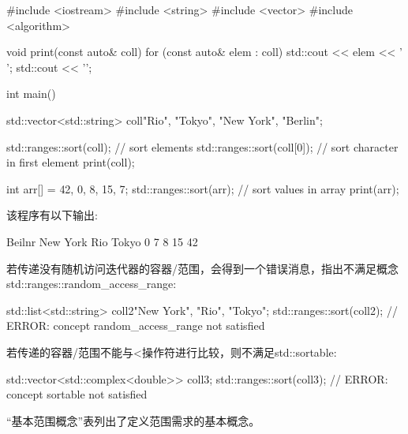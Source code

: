 
\begin{cpp}
#include <iostream>
#include <string>
#include <vector>
#include <algorithm>

void print(const auto& coll) {
	for (const auto& elem : coll) {
		std::cout << elem << ' ';
	}
	std::cout << '\n';
}

int main()
{
	std::vector<std::string> coll{"Rio", "Tokyo", "New York", "Berlin"};
	
	std::ranges::sort(coll); // sort elements
	std::ranges::sort(coll[0]); // sort character in first element
	print(coll);
	
	int arr[] = {42, 0, 8, 15, 7};
	std::ranges::sort(arr); // sort values in array
	print(arr);
}
\end{cpp}

该程序有以下输出:

\begin{shell}
Beilnr New York Rio Tokyo
0 7 8 15 42
\end{shell}

若传递没有随机访问迭代器的容器/范围，会得到一个错误消息，指出不满足概念std::ranges::random\_access\_range:

\begin{cpp}
std::list<std::string> coll2{"New York", "Rio", "Tokyo"};
std::ranges::sort(coll2); // ERROR: concept random_access_range not satisfied
\end{cpp}

若传递的容器/范围不能与<操作符进行比较，则不满足std::sortable:

\begin{cpp}
std::vector<std::complex<double>> coll3;
std::ranges::sort(coll3); // ERROR: concept sortable not satisfied
\end{cpp}


“基本范围概念”表列出了定义范围需求的基本概念。

